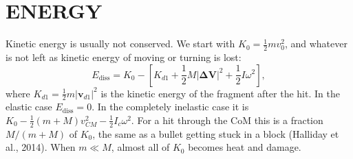 \documentclass{article}
\begin{document}
\section{ENERGY}

Kinetic energy is usually not conserved. We start with $K_0 = \frac{1}{2}mv_0^2$, and whatever is not left as kinetic energy of moving or turning is lost:
\begin{equation}
    E_{\text{diss}} = K_0 - \left[K_{d1} + \frac{1}{2}M|\mathbf{\Delta V}|^2 + \frac{1}{2}I\omega^2\right],
\end{equation}
where $K_{d1} = \frac{1}{2}m|\mathbf{v}_{d1}|^2$ is the kinetic energy of the fragment after the hit. In the elastic case $E_{\text{diss}} = 0$. In the completely inelastic case it is $K_0 - \frac{1}{2}(m + M)v_{CM}^2 - \frac{1}{2}I_c\omega^2$. For a hit through the CoM this is a fraction $M / (m + M)$ of $K_0$, the same as a bullet getting stuck in a block (Halliday et al., 2014). When $m \ll M$, almost all of $K_0$ becomes heat and damage.
\end{document}
